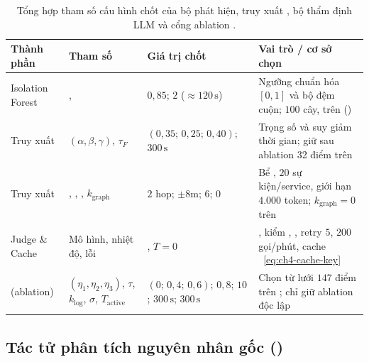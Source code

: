 \begin{table}[H]
  \centering
  \caption[Tổng hợp tham số cấu hình chốt của pipeline phát hiện và CTAV]{Tổng hợp tham số cấu hình chốt của bộ phát hiện, truy xuất , bộ thẩm định LLM và cổng ablation .}
  \label{tab:ch4-pipeline-params}
  \tblfont
  \tblsetup
  \setlength{\tabcolsep}{4pt}
  \begin{tabularx}{\linewidth}{|>{\raggedright\arraybackslash}p{2.3cm}|>{\raggedright\arraybackslash}p{3.1cm}|>{\raggedright\arraybackslash}p{3.2cm}|Y|}
    \hline
    \textbf{Thành phần} & \textbf{Tham số} & \textbf{Giá trị chốt} & \textbf{Vai trò / cơ sở chọn} \\
    \hline
    Isolation Forest & ,  & $0{,}85$;\; $2$ ($\approx 120\,\text{s}$) & Ngưỡng chuẩn hóa $[0, 1]$ và bộ đệm cuộn; $100$ cây,  trên  () \\
    \hline
    Truy xuất  & $(\alpha, \beta, \gamma)$, $\tau_F$ & $(0{,}35;\, 0{,}25;\, 0{,}40)$;\; $300\,\text{s}$ & Trọng số  và suy giảm thời gian; giữ sau ablation 32 điểm trên  \\
    \hline
    Truy xuất  & , , , $k_{\text{graph}}$ & $2$ hop;\; $\pm 8$m;\; $6$;\; $0$ & Bể , $20$ sự kiện/service, giới hạn $4.000$ token; $k_{\text{graph}} = 0$ trên  \\
    \hline
    Judge \& Cache & Mô hình, nhiệt độ, lỗi & , $T = 0$ & , kiểm , , retry $5$, $200$ gọi/phút, cache ~\eqref{eq:ch4-cache-key} \\
    \hline
     (ablation) & $(\eta_1, \eta_2, \eta_3)$, $\tau$, $k_{\text{log}}$, $\sigma$, $T_{\text{active}}$ & $(0;\, 0{,}4;\, 0{,}6)$;\; $0{,}8$;\; $10$;\; $300\,\text{s}$;\; $300\,\text{s}$ & Chọn từ lưới $147$ điểm trên ; chỉ giữ ablation độc lập \\
    \hline
  \end{tabularx}
\end{table}

\subsection{Tác tử phân tích nguyên nhân gốc ()}
\label{sec:ch4-rca}


